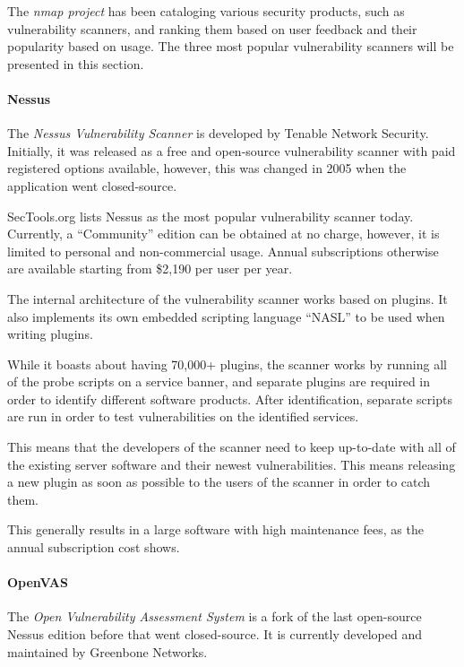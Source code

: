 \documentclass[a4paper,12pt]{article}
\begin{document}
	The \textit{nmap project} has been cataloging various security products, such as vulnerability scanners, and ranking them based on user feedback and their popularity based on usage\cite{sectools}. The three most popular vulnerability scanners will be presented in this section.
	
	\paragraph*{Nessus} The \textit{Nessus Vulnerability Scanner}\cite{nessus} is developed by Tenable Network Security. Initially, it was released as a free and open-source vulnerability scanner with paid registered options available, however, this was changed in 2005 when the application went closed-source.
	
	SecTools.org lists Nessus as the most popular vulnerability scanner today. Currently, a ``Community'' edition can be obtained at no charge, however, it is limited to personal and non-commercial usage. Annual subscriptions otherwise are available starting from \$2,190 per user per year.
	
	The internal architecture of the vulnerability scanner works based on plugins. It also implements its own embedded scripting language ``NASL'' to be used when writing plugins.
	
	While it boasts about having 70,000+ plugins, the scanner works by running all of the probe scripts on a service banner, and separate plugins are required in order to identify different software products. After identification, separate scripts are run in order to test vulnerabilities on the identified services.
	
	This means that the developers of the scanner need to keep up-to-date with all of the existing server software and their newest vulnerabilities. This means releasing a new plugin as soon as possible to the users of the scanner in order to catch them.
	
	This generally results in a large software with high maintenance fees, as the annual subscription cost shows.
	
	\paragraph*{OpenVAS} The \textit{Open Vulnerability Assessment System}\cite{openvas} is a fork of the last open-source Nessus edition before that went closed-source. It is currently developed and maintained by Greenbone Networks.
	
\end{document}
